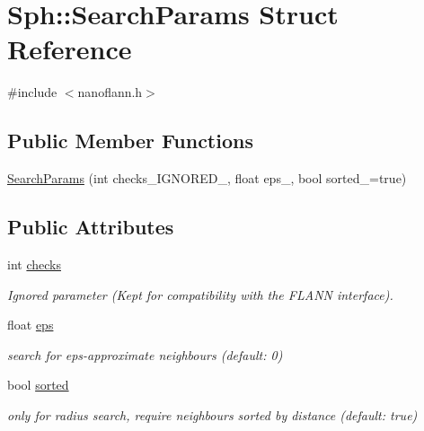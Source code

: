 \hypertarget{structSph_1_1SearchParams}{}\section{Sph\+:\+:Search\+Params Struct Reference}
\label{structSph_1_1SearchParams}


{\ttfamily \#include $<$nanoflann.\+h$>$}

\subsection*{Public Member Functions}
\begin{DoxyCompactItemize}
\item 
\hyperlink{structSph_1_1SearchParams_a810971e8ebb92129213a5413f5717753}{Search\+Params} (int checks\+\_\+\+I\+G\+N\+O\+R\+E\+D\+\_, float eps\+\_, bool sorted\+\_\+=true)
\end{DoxyCompactItemize}
\subsection*{Public Attributes}
\begin{DoxyCompactItemize}
\item 
\hypertarget{structSph_1_1SearchParams_a92f3afd3919379b08bdb3a2c0bb5f1aa}{}\label{structSph_1_1SearchParams_a92f3afd3919379b08bdb3a2c0bb5f1aa} 
int \hyperlink{structSph_1_1SearchParams_a92f3afd3919379b08bdb3a2c0bb5f1aa}{checks}
\begin{DoxyCompactList}\small\item\em Ignored parameter (Kept for compatibility with the F\+L\+A\+NN interface). \end{DoxyCompactList}\item 
\hypertarget{structSph_1_1SearchParams_a6ca37d56508646dfe688cf806b892e53}{}\label{structSph_1_1SearchParams_a6ca37d56508646dfe688cf806b892e53} 
float \hyperlink{structSph_1_1SearchParams_a6ca37d56508646dfe688cf806b892e53}{eps}
\begin{DoxyCompactList}\small\item\em search for eps-\/approximate neighbours (default\+: 0) \end{DoxyCompactList}\item 
\hypertarget{structSph_1_1SearchParams_a4ce5e7d92c7027c4bd2ed5cd0d188ffd}{}\label{structSph_1_1SearchParams_a4ce5e7d92c7027c4bd2ed5cd0d188ffd} 
bool \hyperlink{structSph_1_1SearchParams_a4ce5e7d92c7027c4bd2ed5cd0d188ffd}{sorted}
\begin{DoxyCompactList}\small\item\em only for radius search, require neighbours sorted by distance (default\+: true) \end{DoxyCompactList}\end{DoxyCompactItemize}


